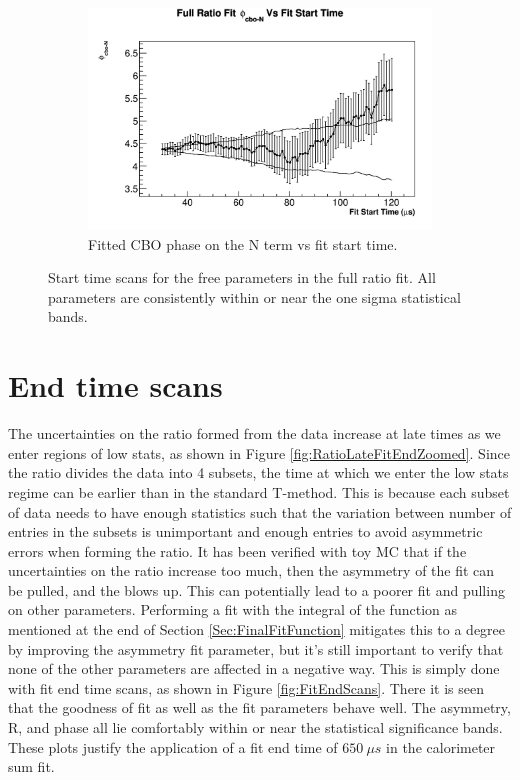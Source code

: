 \begin{figure}[]
\begin{subfigure}[t]{0.45\textwidth}
			\includegraphics[width=\textwidth]{RatioCBO_phi_cbo-N_FS_Canv}
		    \caption{Fitted CBO phase on the N term vs fit start time.}
	    \end{subfigure}%
	\caption[FitStartScans]{Start time scans for the free parameters in the full ratio fit. All parameters are consistently within or near the one sigma statistical bands.}
	\label{fig:FitStartScans}
	\end{figure}

\clearpage

\section{End time scans}

	The uncertainties on the ratio formed from the data increase at late times as we enter regions of low stats, as shown in Figure \ref{fig:RatioLateFitEndZoomed}.  Since the ratio divides the data into 4 subsets, the time at which we enter the low stats regime can be earlier than in the standard T-method.  This is because each subset of data needs to have enough statistics such that the variation between number of entries in the subsets is unimportant and enough entries to avoid asymmetric errors when forming the ratio. It has been verified with toy MC that if the uncertainties on the ratio increase too much, then the asymmetry of the fit can be pulled, and the \chisq blows up. This can potentially lead to a poorer fit and pulling on other parameters. Performing a fit with the integral of the function as mentioned at the end of Section \ref{Sec:FinalFitFunction} mitigates this to a degree by improving the asymmetry fit parameter, but it’s still important to verify that none of the other parameters are affected in a negative way. This is simply done with fit end time scans, as shown in Figure \ref{fig:FitEndScans}. There it is seen that the goodness of fit as well as the fit parameters behave well. The asymmetry, R, and \gmtwo phase all lie comfortably within or near the statistical significance bands. These plots justify the application of a fit end time of $\SI{650}{\mu s}$ in the calorimeter sum fit.

